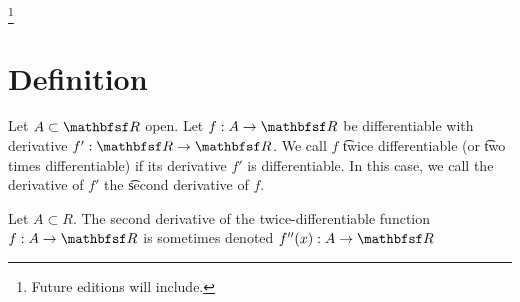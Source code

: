 
\footnote{Future editions will include.}

\section{Definition}

Let $A \subset \R$ open.
Let $f: A \to \R$ be differentiable with derivative $f': \R \to \R$.
We call $f$ \t{twice differentiable} (or \t{two times differentiable}) if its derivative $f'$ is differentiable.
In this case, we call the derivative of $f'$ the \t{second derivative} of $f$.


Let $A \subset R$.
The second derivative of the twice-differentiable function $f: A \to \R$ is sometimes denoted $f''(x): A \to \R$


\blankpage
